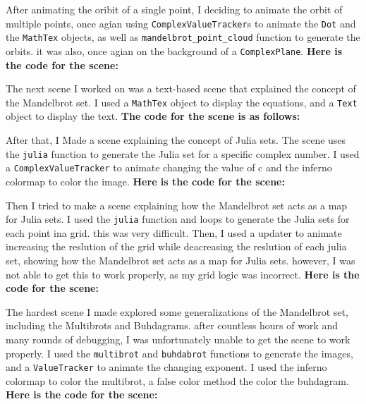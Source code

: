 \documentclass{article}
\begin{document}


After animating the oribit of a single point, I deciding to animate the orbit of multiple points, once agian
using \texttt{ComplexValueTracker}s to animate the \texttt{Dot} and the \texttt{MathTex} objects, as well as \texttt{mandelbrot\_point\_cloud} function 
to generate the orbits. it was also, once agian on the background of a \texttt{ComplexPlane}.
\textbf{Here is the code for the scene:}



The next scene I worked on was a text-based scene that explained the concept of the Mandelbrot set.
I used a \texttt{MathTex} object to display the equations, and a \texttt{Text} object to display the text.
\textbf{The code for the scene is as follows:}



After that, I Made a scene explaining the concept of Julia sets. The scene uses the \texttt{julia} function
to generate the Julia set for a specific complex number. I used a \texttt{ComplexValueTracker} to animate
changing the value of c and the inferno colormap to color the image.
\textbf{Here is the code for the scene:}



Then I tried to make a scene explaining how the Mandelbrot set acts as a map for Julia sets.
I used the \texttt{julia} function and loops to generate the Julia sets for each point ina grid. this was very difficult.
Then, I used a updater to animate increasing the reslution of the grid while deacreasing the reslution of each julia set,
showing how the Mandelbrot set acts as a map for Julia sets. however, I was not able to get this to work properly, as my grid
logic was incorrect.
\textbf{Here is the code for the scene:}



The hardest scene I made explored some generalizations of the Mandelbrot set, including the Multibrots and Buhdagrams.
after countless hours of work and many rounds of debugging, I was unfortunately unable to get the scene to work properly.
I used the \texttt{multibrot} and \texttt{buhdabrot} functions to generate the images, and a \texttt{ValueTracker} to animate the changing exponent.
I used the inferno colormap to color the multibrot, a false color method the color the buhdagram.
\textbf{Here is the code for the scene:}

\end{document}

